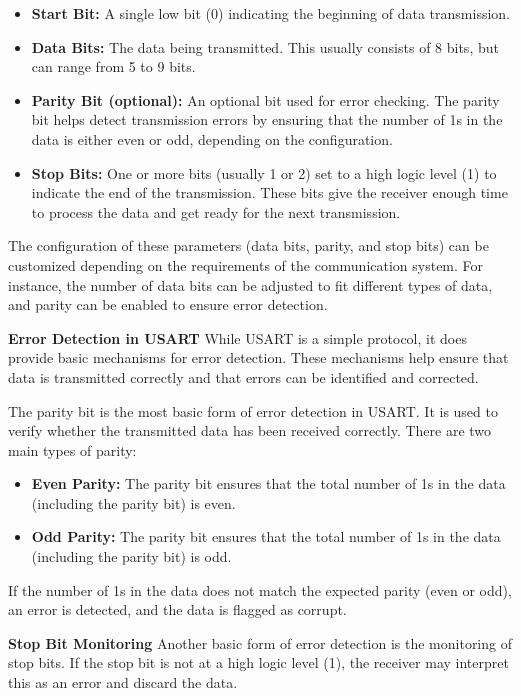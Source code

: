 \documentclass{article}
\numberwithin{equation}{section}
\numberwithin{figure}{section}
\numberwithin{table}{section}
\begin{document}
\begin{itemize}
    \item \textbf{Start Bit:} A single low bit (0) indicating the beginning of data transmission.
    \item \textbf{Data Bits:} The data being transmitted. This usually consists of 8 bits, but can range from 5 to 9 bits.
    \item \textbf{Parity Bit (optional):} An optional bit used for error checking. The parity bit helps detect transmission errors by ensuring that the number of 1s in the data is either even or odd, depending on the configuration.
    \item \textbf{Stop Bits:} One or more bits (usually 1 or 2) set to a high logic level (1) to indicate the end of the transmission. These bits give the receiver enough time to process the data and get ready for the next transmission.
\end{itemize}

The configuration of these parameters (data bits, parity, and stop bits) can be customized depending on the requirements of the communication system. For instance, the number of data bits can be adjusted to fit different types of data, and parity can be enabled to ensure error detection.

\textbf{Error Detection in USART}
While USART is a simple protocol, it does provide basic mechanisms for error detection. These mechanisms help ensure that data is transmitted correctly and that errors can be identified and corrected.

The parity bit is the most basic form of error detection in USART. It is used to verify whether the transmitted data has been received correctly. There are two main types of parity:
\begin{itemize}
    \item \textbf{Even Parity:} The parity bit ensures that the total number of 1s in the data (including the parity bit) is even.
    \item \textbf{Odd Parity:} The parity bit ensures that the total number of 1s in the data (including the parity bit) is odd.
\end{itemize}
If the number of 1s in the data does not match the expected parity (even or odd), an error is detected, and the data is flagged as corrupt.

\textbf{Stop Bit Monitoring}
Another basic form of error detection is the monitoring of stop bits. If the stop bit is not at a high logic level (1), the receiver may interpret this as an error and discard the data.
\end{document}
